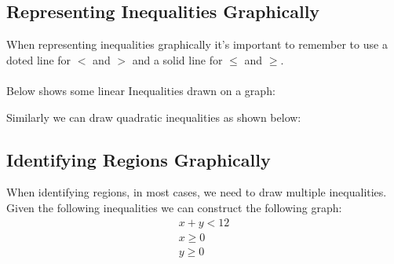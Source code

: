 \documentclass{article}
\begin{document}
\subsection{Representing Inequalities Graphically}
When representing inequalities graphically it's important to remember to use a doted line for $<$ and $>$
and a solid line for $\leq$ and $\geq$.
\\\\
Below shows some linear Inequalities drawn on a graph:
\begin{center}
\end{center}
Similarly we can draw quadratic inequalities as shown below:

\begin{center}
\end{center}

\break

\subsection{Identifying Regions Graphically}
When identifying regions, in most cases, we need to draw multiple inequalities. Given the following inequalities
we can construct the following graph:
\begin{gather*}
	x + y < 12 \\
	x \geq 0 \\
	y \geq 0
\end{gather*}
\end{document}
